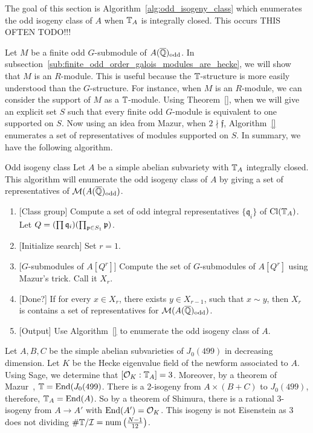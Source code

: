 \documentclass{article}
\renewcommand{\q}{\mathfrak{q}}
\newcommand{\I}{\mathcal{I}}
\newcommand{\odd}{\mathrm{odd}}
\begin{document}
The goal of this section is Algorithm~\ref{alg:odd_isogeny_class} which
enumerates the odd isogeny class of $A$ when $\mathbb{T}_A$ is integrally closed. This
occurs THIS OFTEN TODO!!!

Let $M$ be a finite odd $G$-submodule of $A(\QQbar)_\odd$. In
subsection~\ref{sub:finite_odd_order_galois_modules_are_hecke}, we will show
that $M$ is an $R$-module. This is useful because the $\mathbb{T}$-structure is more
easily understood than the $G$-structure. For instance, when $M$ is an
$R$-module, we can consider the support of $M$ as a $\mathbb{T}$-module. Using
Theorem~\ref{}, when we will give an explicit set $S$ such that every finite odd
$G$-module is equivalent to one supported on $S$. Now using an idea from Mazur,
when $2\nmid \mathfrak{f}$, Algorithm~\ref{} enumerates a set of
representatives of modules supported on $S$. In summary, we have the following
algorithm.

\begin{algorithm}{Odd isogeny class}%
    \label{alg:odd_isogeny_class}
    Let $A$ be a simple abelian subvariety with $\mathbb{T}_A$ integrally closed. This
    algorithm will enumerate the odd isogeny class of $A$ by giving a set of
    representatives of $\M(A(\QQbar)_\odd)$.
    \begin{enumerate}
        \item{} [Class group]
            Compute a set of odd integral representatives $\{\q_i\}$ of
            $\operatorname{Cl}(\mathbb{T}_A)$. Let $Q = (\prod \q_i)(\prod_{\p\in S_1} \p)$. 
        \item{} [Initialize search]
            Set $r=1$.
        \item{} [$G$-submodules of $A[Q^r]$]
            Compute the set of $G$-submodules of $A[Q^r]$ using Mazur's trick.
            Call it $X_r$.
        \item{} [Done?]
            If for every $x\in X_r$, there exists $y\in X_{r-1}$, such that
            $x\sim y$, then $X_r$ is contains a set of representatives for
            $\M(A(\QQbar)_\odd)$.
        \item{} [Output]
            Use Algorithm~\ref{} to enumerate the odd isogeny class of $A$. 
    \end{enumerate}
\end{algorithm}

\begin{example}
    Let $A,B,C$ be the simple abelian subvarieties of $J_0(499)$ in decreasing
    dimension. Let $K$ be the Hecke
    eigenvalue field of the newform associated to $A$. Using Sage, we
    determine that $[\mathcal{O}_K:\mathbb{T}_A]=3$. Moreover, by a theorem of Mazur~\cite{},
    $\mathbb{T}=\operatorname{End}(J_0(499)$. There is a 2-isogeny from $A\times (B+C)$ to
    $J_0(499)$, therefore, $\mathbb{T}_A=\operatorname{End}(A)$. So by a theorem of Shimura, there
    is a rational 3-isogeny from $A\to A'$ with $\operatorname{End}(A')=\mathcal{O}_K$. This isogeny
    is not Eisenstein as $3$ does not dividing $\# \TT/\I = \mathrm{num}
    \left(\frac{N-1}{12}\right)$.
\end{example}
\end{document}
